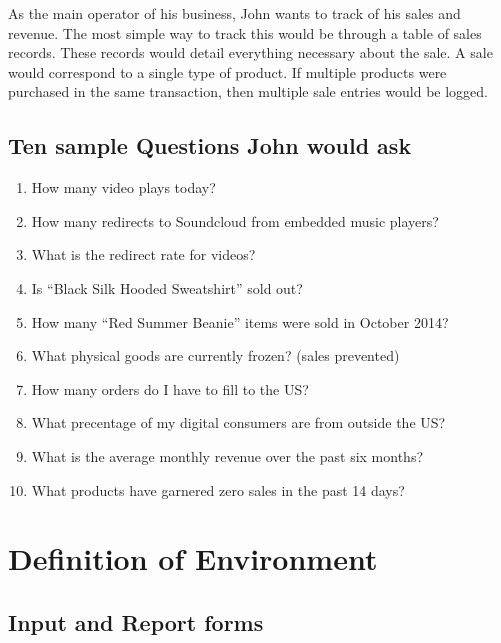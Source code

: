 \documentclass[11pt, a4paper]{report}
\begin{document}
As the main operator of his business, John wants to track of his sales and revenue. The most simple way to track this would be through a table of sales records. These records would detail everything necessary about the sale. A sale would correspond to a single type of product. If multiple products were purchased in the same transaction, then multiple sale entries would be logged.\\

\clearpage
\section{Ten sample Questions John would ask}
\begin{enumerate}
    \item How many video plays today?
    \item How many redirects to Soundcloud from embedded music players?
    \item What is the redirect rate for videos?
    \item Is ``Black Silk Hooded Sweatshirt'' sold out?
    \item How many ``Red Summer Beanie'' items were sold in October 2014?
    \item What physical goods are currently frozen? (sales prevented)
    \item How many orders do I have to fill to the US?
    \item What precentage of my digital consumers are from outside the US?
    \item What is the average monthly revenue over the past six months?
    \item What products have garnered zero sales in the past 14 days? 
\end{enumerate}

\chapter{Definition of Environment}

\section{Input and Report forms}
\end{document}
